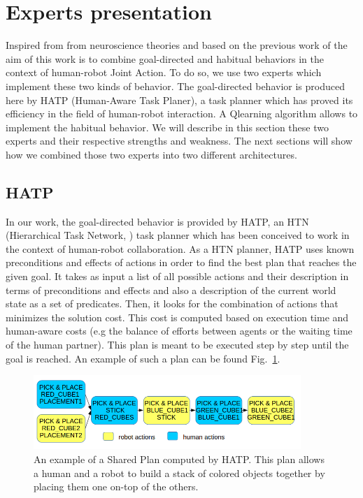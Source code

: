 \documentclass[english,a4paper,11pt,twoside]{StyleThese}
\begin{document}
\section{Experts presentation}

Inspired from from neuroscience theories and based on the previous work of \cite{renaudo2014design} the aim of this work is to combine goal-directed and habitual behaviors in the context of human-robot Joint Action. To do so, we use two experts which implement these two kinds of behavior. The goal-directed behavior is produced here by HATP (Human-Aware Task Planer), a task planner which has proved its efficiency in the field of human-robot interaction. A Qlearning algorithm allows to implement the habitual behavior. We will describe in this section these two experts and their respective strengths and weakness. The next sections will show how we combined those two experts into two different architectures.

\subsection{HATP}

In our work, the goal-directed behavior is provided by HATP, an HTN (Hierarchical Task Network, \cite{erol1994htn}) task planner which has been conceived to work in the context of human-robot collaboration.  As a HTN planner, HATP uses known preconditions and effects of actions in order to find the best plan that reaches the given goal. It takes as input a list of all possible actions and their description in terms of preconditions and effects and also a description of the current world state as a set of predicates. Then, it looks for the combination of actions that minimizes the solution cost. This cost is computed based on execution time and human-aware costs (e.g the balance of efforts between agents or the waiting time of the human partner). This plan is meant to be executed step by step until the goal is reached. An example of such a plan can be found Fig.~\ref{fig:examplePlan}.

\begin{figure}[!h]
	\centering
    \includegraphics[width=0.9\textwidth]{figs/Chapter7/SharedPlan.png}
    \caption{An example of a Shared Plan computed by HATP. This plan allows a human and a robot to build a stack of colored objects together by placing them one on-top of the others.}
    \label{fig:examplePlan}
\end{figure}
\end{document}
